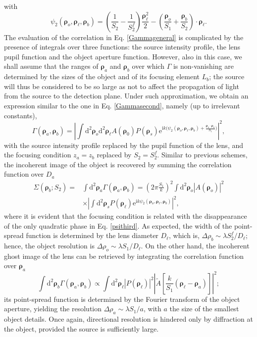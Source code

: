 \documentclass[aps,pra,amssymb,twocolumn,amsmath,superscriptaddress,showpacs,10pt]{revtex4-1}
\def\e{\mathrm{e}}
\def\d{\mathrm{d}}
\def\i{\mathrm{i}}
\begin{document}
with
\begin{equation}\label{psithird}
\psi_2(\bm{\rho}_o,\bm{\rho}_{\ell},\bm{\rho}_b) = \left(\frac{1}{S_2}-\frac{1}{S_2^f}\right) \frac{\bm{\rho}_{\ell}^2}{2} - \left( \frac{\bm{\rho}_o}{S_1} + \frac{\bm{\rho}_b}{S_2} \right) \cdot \bm{\rho}_{\ell}.
\end{equation}
The evaluation of the correlation in Eq. \eqref{Gammageneral} is complicated by the presence of integrals over three functions: the source intensity profile, the lens pupil function and the object aperture function. However, also in this case, we shall assume that the ranges of $\bm{\rho}_a$ and $\bm{\rho}_b$ over which $\Gamma$ is non-vanishing are determined by the sizes of the object and of its focusing element $L_b$; the source will thus be considered to be so large as not to affect the propagation of light from the source to the detection plane. Under such approximation, we obtain an expression similar to the one in Eq. \eqref{Gammasecond}, namely (up to irrelevant constants),
\begin{equation}\label{Gammathird}
\Gamma(\bm{\rho}_a,\bm{\rho}_b) \!=\! \left|\!\int\!\d^2\bm{\rho}_o \d^2\bm{\rho}_{\ell}  A(\bm{\rho}_0) P(\bm{\rho}_s) \e^{\i k \!\bigl(\! \psi_2(\bm{\rho}_o,\bm{\rho}_{\ell},\bm{\rho}_b) + \frac{\bm{\rho}_o\cdot\bm{\rho}_a}{S_1} \!\bigr)} \!\right|^2,
\end{equation}
with the source intensity profile replaced by the pupil function of the lens, and the focusing condition $z_a=z_b$ replaced by $S_2=S_2^f$. Similar to previous schemes, the incoherent image of the object is recovered by summing the correlation function over $D_a$
\begin{align}
\Sigma(\bm{\rho}_b;S_2) = & \int\!\d^2\bm{\rho}_a \Gamma(\bm{\rho}_a,\bm{\rho}_b) = \!\left(\!2\pi \frac{S_1}{k}\!\right)^2 \!\int\!\d^2\bm{\rho}_o |A(\bm{\rho}_o)|^2 \nonumber \\
& \times \left| \int\d^2\bm{\rho}_s P(\bm{\rho}_{\ell}) \e^{\i k \psi_2(\bm{\rho}_o,\bm{\rho}_{\ell},\bm{\rho}_b)} \right|^2 ,
\end{align}
where it is evident that the focusing condition is related with the disappearance of the only quadratic phase in Eq. \eqref{psithird}. As expected, the width of the point-spread function is determined by the lens diameter $D_{\ell}$, which is, $\Delta\rho_b \sim \lambda S_2^f/D_{\ell}$; hence, the object resolution is $\Delta\rho_o\sim \lambda S_1/D_{\ell}$. On the other hand, the incoherent ghost image of the lens can be retrieved by integrating the correlation function over $\bm{\rho}_a$
\begin{equation}
\int\!\d^2\bm{\rho}_b \Gamma(\bm{\rho}_a,\bm{\rho}_b) \propto \int\!\d^2\bm{\rho}_{\ell} |P(\bm{\rho}_{\ell})|^2 \left| \tilde{A} \!\left[ \frac{k}{S_1} (\bm{\rho}_{\ell} - \bm{\rho}_a)  \right]\right|^2;
\end{equation}
its point-spread function is determined by the Fourier transform of the object aperture, yielding the resolution $\Delta\rho_a\sim \lambda S_1/a$, with $a$ the size of the smallest object details. Once again, directional resolution is hindered only by diffraction at the object, provided the source is sufficiently large.
\end{document}
